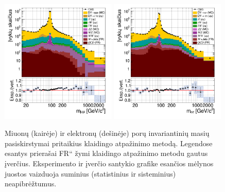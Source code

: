 \documentclass[a4paper, 12pt, oneside]{article}
\newcommand{\ltq}[1]{{\quotedblbase{}#1\textquotedblleft{}}}
\newlength\q
\begin{document}
\begin{figure}[t!]
	\includegraphics[width=0.49\textwidth]{Magistrinis/MuMumass_afterFR.png}
	\includegraphics[width=0.49\textwidth]{Magistrinis/EEmass_afterFR.png}
	\vspace{-0.3cm}
	\caption{\label{fig:MassFinal}
		Miuonų (kairėje) ir elektronų (dešinėje) porų invariantinių masių pasiskirstymai pritaikius klaidingo atpažinimo metodą.
		Legendose esantys prierašai \ltq{FR} žymi klaidingo atpažinimo metodu gautus įverčius.
		Eksperimento ir įverčio santykio grafike esančios mėlynos juostos vaizduoja suminius (statistinius ir sisteminius)
		neapibrėžtumus.}
\end{figure}

\newpage
\end{document}
